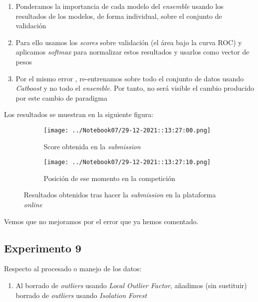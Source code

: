 \documentclass[11pt]{article}
\begin{document}
\begin{enumerate}
    \item Ponderamos la importancia de cada modelo del \emph{ensemble} usando los resultados de los modelos, de forma individual, sobre el conjunto de validación
    \item Para ello usamos los \emph{scores} sobre validación (el área bajo la curva ROC) y aplicamos \emph{softmax} para normalizar estos resultados y usarlos como vector de pesos
    \item Por el mismo error , re-entrenamos sobre todo el conjunto de datos usando \emph{Catboost} y no todo el \emph{ensemble}. Por tanto, no será visible el cambio producido por este cambio de paradigma
\end{enumerate}

Los resultados se muestran en la siguiente figura:

\begin{figure}[H]
    \centering

    \begin{subfigure}[b]{0.45 \textwidth}
        \texttt{[image: ../Notebook07/29-12-2021::13:27:00.png]}
        \caption{Score obtenida en la \emph{submission}}
    \end{subfigure}
    \begin{subfigure}[b]{0.45 \textwidth}
        \texttt{[image: ../Notebook07/29-12-2021::13:27:10.png]}
        \caption{Posición de ese momento en la competición}
    \end{subfigure}

    \caption{Resultados obtenidos tras hacer la \emph{submission} en la plataforma \emph{online}}
\end{figure}

Vemos que no mejoramos por el error que ya hemos comentado.

\pagebreak

\subsection{Experimento 9}

Respecto al procesado o manejo de los datos:

\begin{enumerate}
    \item Al borrado de \emph{outliers} usando \emph{Local Outlier Factor}, añadimos (sin sustituir) borrado de \emph{outliers} usando \emph{Isolation Forest}
\end{enumerate}
\end{document}
